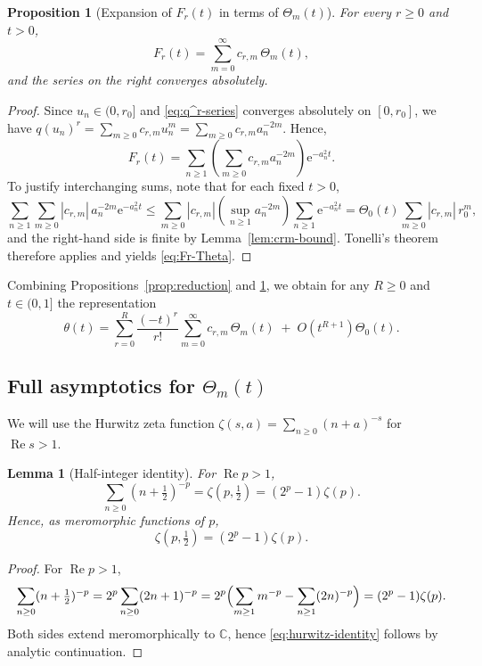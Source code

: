 \documentclass[11pt,letterpaper]{amsart}
\numberwithin{equation}{section}
\newtheorem{lemma}[theorem]{Lemma}
\newtheorem{proposition}[theorem]{Proposition}
\theoremstyle{definition}
\newcommand{\C}{\mathbb{C}}
\newcommand{\Ree}{\operatorname{Re}}
\newcommand{\e}{\mathrm{e}}
\begin{document}
\begin{proposition}[Expansion of $F_r(t)$ in terms of $\Theta_m(t)$]\label{prop:Fr-Theta}
For every $r\ge 0$ and $t>0$,
\begin{equation}\label{eq:Fr-Theta}
F_r(t)=\sum_{m=0}^\infty c_{r,m}\,\Theta_m(t),
\end{equation}
and the series on the right converges absolutely.
\end{proposition}

\begin{proof}
Since $u_n\in(0,r_0]$ and \eqref{eq:q^r-series} converges absolutely on $[0,r_0]$,
we have $q(u_n)^r=\sum_{m\ge 0}c_{r,m}u_n^m=\sum_{m\ge 0}c_{r,m}a_n^{-2m}$.
Hence,
\[
F_r(t)=\sum_{n\ge 1}\left(\sum_{m\ge 0}c_{r,m}a_n^{-2m}\right)\e^{-a_n^2 t}.
\]
To justify interchanging sums, note that for each fixed $t>0$,
\[
\sum_{n\ge 1}\sum_{m\ge 0}|c_{r,m}|\,a_n^{-2m}\e^{-a_n^2 t}
\le \sum_{m\ge 0}|c_{r,m}|\left(\sup_{n\ge 1}a_n^{-2m}\right)\sum_{n\ge 1}\e^{-a_n^2 t}
= \Theta_0(t)\sum_{m\ge 0}|c_{r,m}|\,r_0^m,
\]
and the right-hand side is finite by Lemma~\ref{lem:crm-bound}. Tonelli's theorem
therefore applies and yields \eqref{eq:Fr-Theta}.
\end{proof}

\medskip
Combining Propositions~\ref{prop:reduction} and \ref{prop:Fr-Theta}, we obtain for any
$R\ge 0$ and $t\in(0,1]$ the representation
\begin{equation}\label{eq:theta-double}
\theta(t)
=\sum_{r=0}^{R}\frac{(-t)^r}{r!}\sum_{m=0}^\infty c_{r,m}\,\Theta_m(t)
\;+\;O(t^{R+1})\Theta_0(t).
\end{equation}


\subsection{Full asymptotics for $\Theta_m(t)$}\label{subsec:Theta-asymp}
We will use the Hurwitz zeta function $\zeta(s,a)=\sum_{n\ge 0}(n+a)^{-s}$ for $\Ree s>1$.

\begin{lemma}[Half-integer identity]\label{lem:hurwitz-half}
For $\Ree p>1$,
\[
\sum_{n\ge 0}(n+\tfrac12)^{-p}=\zeta(p,\tfrac12)=(2^p-1)\zeta(p).
\]
Hence, as meromorphic functions of $p$,
\begin{equation}\label{eq:hurwitz-identity}
\zeta(p,\tfrac12)=(2^p-1)\zeta(p).
\end{equation}
\end{lemma}

\begin{proof}
For $\Ree p>1$,
\[
\sum_{n\ge 0}(n+\tfrac12)^{-p}
=2^p\sum_{n\ge 0}(2n+1)^{-p}
=2^p\Bigl(\sum_{m\ge 1}m^{-p}-\sum_{n\ge 1}(2n)^{-p}\Bigr)
=(2^p-1)\zeta(p).
\]
Both sides extend meromorphically to $\C$, hence \eqref{eq:hurwitz-identity} follows by analytic continuation.
\end{proof}
\end{document}
